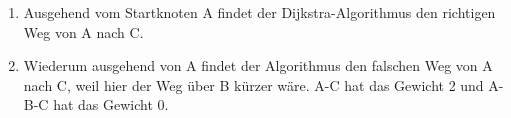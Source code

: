 \documentclass[a4paper, 12pt, margins=3cm]{homework}
\begin{document}
  \begin{problem}

  \end{problem}
  \begin{solution}\hfill
    \begin{enumerate}[label=\alph*)]\itemsep0pt
      \item \hfill
        \begin{center}
        \end{center}
        Ausgehend vom Startknoten A findet der Dijkstra-Algorithmus den richtigen
        Weg von A nach C. 
        \newpage
      \item \hfill
        \begin{center}
        \end{center}
        Wiederum ausgehend von A findet der Algorithmus den falschen Weg von A
        nach C, weil hier der Weg über B kürzer wäre. A-C hat das Gewicht 2 und 
        A-B-C hat das Gewicht 0.
    \end{enumerate}
  \end{solution}
  
\end{document}
